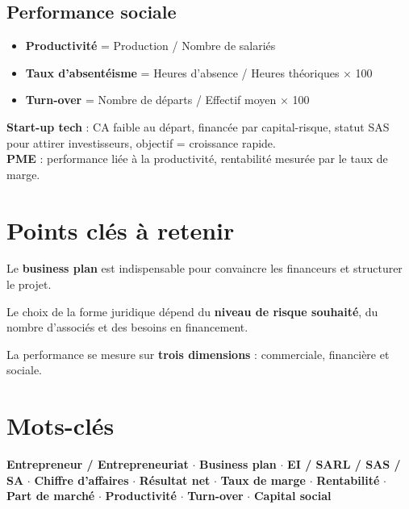\documentclass[11pt,a4paper]{article}
\begin{document}
\subsection*{Performance sociale}
\begin{itemize}
  \item \textbf{Productivité} = Production / Nombre de salariés
  \item \textbf{Taux d'absentéisme} = Heures d'absence / Heures théoriques × 100
  \item \textbf{Turn-over} = Nombre de départs / Effectif moyen × 100
\end{itemize}

\vspace{4pt}
\begin{exbox}
\textbf{Start-up tech} : CA faible au départ, financée par capital-risque, statut SAS pour attirer investisseurs, objectif = croissance rapide.\\
\textbf{PME} : performance liée à la productivité, rentabilité mesurée par le taux de marge.
\end{exbox}

\section*{Points clés à retenir}

\begin{keybox}
Le \textbf{business plan} est indispensable pour convaincre les financeurs et structurer le projet.
\end{keybox}
\vspace{3pt}
\begin{keybox}
Le choix de la forme juridique dépend du \textbf{niveau de risque souhaité}, du nombre d'associés et des besoins en financement.
\end{keybox}
\vspace{3pt}
\begin{keybox}
La performance se mesure sur \textbf{trois dimensions} : commerciale, financière et sociale.
\end{keybox}

\section*{Mots-clés}
\textcolor{mainColor}{\textbf{Entrepreneur / Entrepreneuriat}} $\cdot$
\textcolor{mainColor}{\textbf{Business plan}} $\cdot$
\textcolor{mainColor}{\textbf{EI / SARL / SAS / SA}} $\cdot$
\textcolor{mainColor}{\textbf{Chiffre d'affaires}} $\cdot$
\textcolor{mainColor}{\textbf{Résultat net}} $\cdot$
\textcolor{mainColor}{\textbf{Taux de marge}} $\cdot$
\textcolor{mainColor}{\textbf{Rentabilité}} $\cdot$
\textcolor{mainColor}{\textbf{Part de marché}} $\cdot$
\textcolor{mainColor}{\textbf{Productivité}} $\cdot$
\textcolor{mainColor}{\textbf{Turn-over}} $\cdot$
\textcolor{mainColor}{\textbf{Capital social}}
\end{document}
